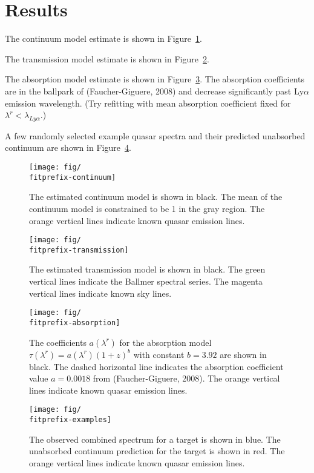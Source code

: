 \documentclass[oneside,10pt]{article}
\providecommand{\fig}[1]{Figure~\ref{fig:#1}}
\providecommand{\lambdarest}{\lambda^r}
\providecommand{\fitprefix}{random-n10000}
\begin{document}
\section{Results}

The continuum model estimate is shown in \fig{continuum}. 

The transmission model estimate is shown in \fig{transmission}.

The absorption model estimate is shown in \fig{absorption}. The absorption coefficients are in the ballpark 
of (Faucher-Giguere, 2008) and decrease significantly past Ly$\alpha$ emission wavelength. 
(Try refitting with mean absorption coefficient fixed for $\lambdarest < \lambda_{Ly\alpha}$.)

A few randomly selected example quasar spectra and their predicted unabsorbed continuum are shown in \fig{examples}. 

\clearpage

\begin{figure}
\texttt{[image: fig/\\fitprefix-continuum]}
\centering
\caption{The estimated continuum model is shown in black. The mean of the continuum model is 
constrained to be 1 in the gray region. The orange vertical lines indicate known quasar emission lines.}
\label{fig:continuum}
\end{figure}

\begin{figure}
\texttt{[image: fig/\\fitprefix-transmission]}
\centering
\caption{The estimated transmission model is shown in black. The green vertical lines indicate the Ballmer spectral series.
The magenta vertical lines indicate known sky lines.}
\label{fig:transmission}
\end{figure}

\clearpage

\begin{figure}
\texttt{[image: fig/\\fitprefix-absorption]}
\centering
\caption{The coefficients $a(\lambdarest)$ for the absorption model $\tau(\lambdarest) = a(\lambdarest)(1+z)^b$ with constant $b=3.92$ are shown in black. The dashed horizontal line indicates the absorption coefficient 
value $a=0.0018$ from (Faucher-Giguere, 2008). The orange vertical lines indicate known quasar emission lines. }
\label{fig:absorption}
\end{figure}


\begin{figure}
\texttt{[image: fig/\\fitprefix-examples]}
\caption{The observed combined spectrum for a target is shown in blue. The unabsorbed continuum prediction for the target is shown in red.
The orange vertical lines indicate known quasar emission lines. }
\label{fig:examples}
\end{figure}
\end{document}
